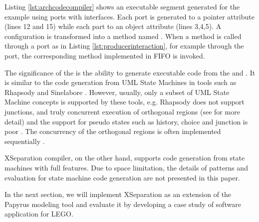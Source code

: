 \vskip 0.1cm
\noindent
{}
Listing \ref{lst:archcodecompiler} shows an executable  segment generated for the  example using ports with interfaces.
Each port is generated to a pointer attribute (lines 12 and 15) while each part to an object attribute (lines 3,4,5).
A configuration is transformed into a method named .
When a method is called through a port as in Listing \ref{lst:producerinteraction}, for example  through the  port, the corresponding method implemented in FIFO is invoked. 



\vskip 0.1cm
\noindent
{}
The significance of the  is the ability to generate executable code from the  and .
It is similar to the code generation from UML State Machines in tools such as Rhapsody and Sinelabore \cite{sinelabore}.
However, usually, only a subset of UML State Machine concepts is supported by these tools, e.g. Rhapsody does not support junctions, and truly concurrent execution of orthogonal regions
\cite{ibmdiff} (see \cite{specification_uml_2007} for more detail) and the support for pseudo states such as history, choice and junction is poor \cite{EA, sinelabore}. 
The concurrency of the orthogonal regions is often implemented sequentially \cite{Badreddin2014}. 

XSeparation compiler, on the other hand, supports code generation from state machines with full features.
Due to space limitation, the details of patterns and evaluation for state machine code generation are not presented in this paper.



In the next section, we will implement XSeparation as an extension of the Papyrus modeling tool and evaluate it by developing a case study of software application for LEGO.